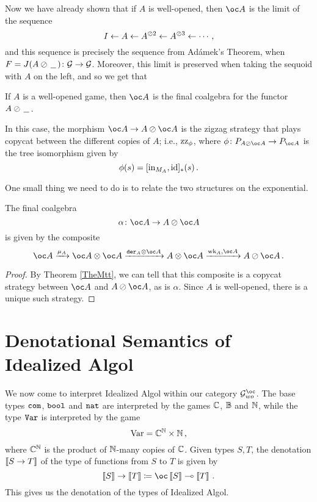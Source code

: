 \documentclass[11pt]{report}
\begin{document}
Now we have already shown that if $A$ is well-opened, then $\oc A$ is the limit of the sequence
\[
  I \leftarrow A \leftarrow A^{\oslash 2} \leftarrow A^{\oslash 3} \leftarrow \cdots\,,
  \]
and this sequence is precisely the sequence from Ad{\'a}mek's Theorem, when $F=J(A\oslash\,\underline{\hspace{1.5ex}}\,) \colon \mathcal G \to \mathcal G$.
Moreover, this limit is preserved when taking the sequoid with $A$ on the left, and so we get that
\begin{corollary}
  If $A$ is a well-opened game, then $\oc A$ is the final coalgebra for the functor $A \oslash \,\underline{\hspace{1.5ex}}\,$.
\end{corollary}
In this case, the morphism $\oc A \to A \sequoid \oc A$ is the zigzag strategy that plays copycat between the different copies of $A$; i.e., $\operatorname{zz}_\phi$, where $\phi\from P_{A\sequoid \oc A} \to P_{\oc A}$ is the tree isomorphism given by
\[
  \phi(s) = [\operatorname{in}_{M_A},\operatorname{id}]_*(s)\,.
  \]

One small thing we need to do is to relate the two structures on the exponential.

\begin{proposition}
  The final coalgebra
  \[
    \alpha\from \oc A \to A \sequoid \oc A
    \]
  is given by the composite
  \[
    \oc A \xrightarrow{\mu_A} \oc A \tensor \oc A \xrightarrow{\der_A\tensor \oc A} A \tensor \oc A \xrightarrow{\wk_A,\oc A} A \sequoid \oc A\,.
    \]
  \label{PropFormulaForAlpha}
\end{proposition}
\begin{proof}
  By Theorem \ref{TheMtt}, we can tell that this composite is a copycat strategy between $\oc A$ and $A \sequoid \oc A$, as is $\alpha$.  
  Since $A$ is well-opened, there is a unique such strategy.
\end{proof}

\section{Denotational Semantics of Idealized Algol}

We now come to interpret Idealized Algol within our category $\G_{wo}^{\oc}$.  
The base types ${\mathtt{com}}$, ${\mathtt{bool}}$ and ${\mathtt{nat}}$ are interpreted by the games $\mathbb{C}$, $\mathbb{B}$ and $\mathbb{N}$, while the type ${\mathtt{Var}}$ is interpreted by the game
\[
  \operatorname{Var} = \mathbb{C}^{\mathbb{N}} \times \mathbb{N}\,,
  \]
where $\mathbb{C}^{\mathbb{N}}$ is the product of $\mathbb{N}$-many copies of $\mathbb{C}$.
Given types $S,T$, the denotation $\left\llbracket S\to T\right\rrbracket$ of the type of functions from $S$ to $T$ is given by
\[
  \deno{S}\to\deno{T} \coloneqq \oc\deno{S}\implies\deno{T}\,.
  \]
This gives us the denotation of the types of Idealized Algol.  
\end{document}
